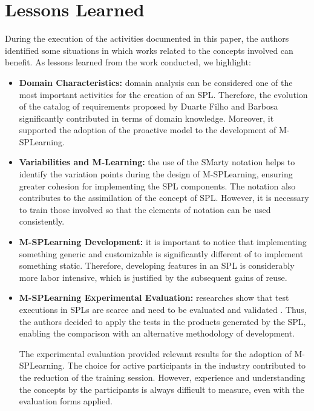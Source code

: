 \section{Lessons Learned}\label{section5}

During the execution of the activities documented in this paper, the authors identified some situations in which works related to the concepts involved can benefit. As lessons learned from the work conducted, we highlight:

\begin{itemize}
    \item \textbf{Domain Characteristics:} domain analysis can be considered one of the most important activities for the creation of an SPL. Therefore, the evolution of the catalog of requirements proposed by Duarte Filho and Barbosa \cite{filho13} significantly contributed in terms of domain knowledge. Moreover, it supported the adoption of the proactive model to the development of M-SPLearning.
    \item \textbf{Variabilities and M-Learning:} the use of the SMarty notation helps to identify the variation points during the design of M-SPLearning, ensuring greater cohesion for implementing the SPL components. The notation also contributes to the assimilation of the concept of SPL. However, it is necessary to train those involved so that the elements of notation can be used consistently.
    \item \textbf{M-SPLearning Development:} it is important to notice that implementing something generic and customizable is significantly different of to implement something static. Therefore, developing features in an SPL is considerably more labor intensive, which is justified by the subsequent gains of reuse.
    \item \textbf{M-SPLearning Experimental Evaluation:} researches show that test executions in SPLs are scarce and need to be evaluated and validated \cite{engstrom11}. Thus, the authors decided to apply the tests in the products generated by the SPL, enabling the comparison with an alternative methodology of development.
  
    The experimental evaluation provided relevant results for the adoption of M-SPLearning. The choice for active participants in the industry contributed to the reduction of the training session. However, experience and understanding the concepts by the participants is always difficult to measure, even with the evaluation forms applied. 
\end{itemize}